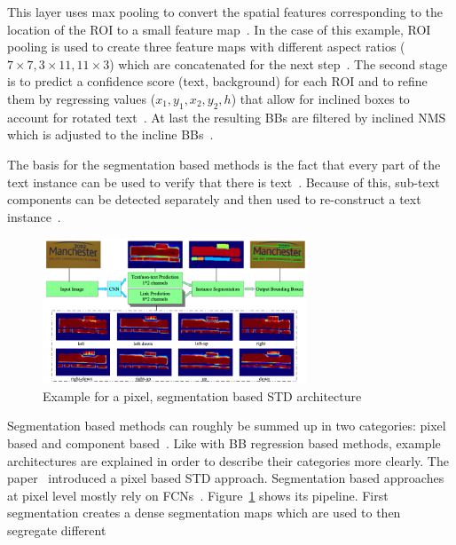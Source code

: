 This layer uses max pooling to convert the spatial features corresponding to the location of the
\ac{ROI} to a small feature map~\citep{girshick_fast_2015}.
In the case of this example, \ac{ROI} pooling is used to create three feature maps with different
aspect ratios ($7\times7, 3\times11, 11\times3$) which are concatenated for the next
step~\citep{jiang_r2cnn_2017}.
The second stage is to predict a confidence score (text, background) for each \ac{ROI} and to
refine them by regressing values ($x_1,y_1,x_2,y_2,h$) that allow for inclined boxes to account for
rotated text~\citep{jiang_r2cnn_2017}.
At last the resulting \acp{BB} are filtered by inclined \ac{NMS} which is adjusted to the
incline \acp{BB}~\citep{jiang_r2cnn_2017}.

The basis for the segmentation based methods is the fact that every part of the text instance can
be used to verify that there is text~\citep{long_scene_2021}.
Because of this, sub-text components can be detected separately and then used to re-construct a text
instance~\citep{long_scene_2021}.
\begin{figure}[ht]
    \centering
    \includegraphics[width=0.7\textwidth]{img/STD-seg-based-architecture-Deng-PixelLink-2018.png}
    \caption[Pixel, segmentation based STD architecture]{%
        Example for a pixel, segmentation based STD
        architecture~\citep{deng_pixellink_2018}\label{fig:STD-segbased-pixel-architecture}
    }
\end{figure}
Segmentation based methods can roughly be summed up in two categories: pixel based and component
based~\citep{long_scene_2021}.
Like with \ac{BB} regression based methods, example architectures are explained in order to
describe their categories more clearly.
The paper~\cite{deng_pixellink_2018} introduced a pixel based \ac{STD} approach.
Segmentation based approaches at pixel level mostly rely on \acp{FCN}~\citep{dai_fused_2018}.
Figure~\ref{fig:STD-segbased-pixel-architecture} shows its pipeline.
First segmentation creates a dense segmentation maps which are used to then segregate different
